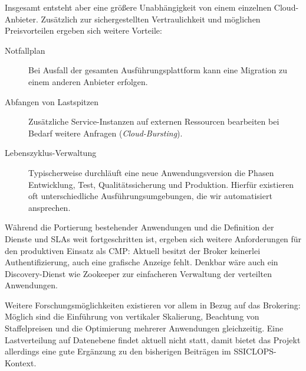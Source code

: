 Insgesamt entsteht aber eine größere Unabhängigkeit von einem einzelnen Cloud-Anbieter. Zusätzlich zur sichergestellten Vertraulichkeit und möglichen Preisvorteilen ergeben sich weitere Vorteile:

\begin{description}
	
	\item[Notfallplan] Bei Ausfall der gesamten Ausführungsplattform kann eine Migration zu einem anderen Anbieter erfolgen.
	
	\item[Abfangen von Lastspitzen] Zusätzliche Service-Instanzen auf externen Ressourcen bearbeiten bei Bedarf weitere Anfragen (\emph{Cloud-Bursting}).
	
	\item[Lebenszyklus-Verwaltung] Typischerweise durchläuft eine neue Anwendungsversion die Phasen Entwicklung, Test, Qualitätssicherung und Produktion. Hierfür existieren oft unterschiedliche Ausführungsumgebungen, die wir automatisiert ansprechen.
	
\end{description}

Während die Portierung bestehender Anwendungen und die Definition der Dienste und SLAs weit fortgeschritten ist, ergeben sich weitere Anforderungen für den produktiven Einsatz als CMP: Aktuell besitzt der Broker keinerlei Authentifizierung, auch eine grafische Anzeige fehlt. Denkbar wäre auch ein Discovery-Dienst wie Zookeeper zur einfacheren Verwaltung der verteilten Anwendungen.

Weitere Forschungsmöglichkeiten existieren vor allem in Bezug auf das Brokering: Möglich sind die Einführung von vertikaler Skalierung, Beachtung von Staffelpreisen und die Optimierung mehrerer Anwendungen gleichzeitig. Eine Lastverteilung auf Datenebene findet aktuell nicht statt, damit bietet das Projekt allerdings eine gute Ergänzung zu den bisherigen Beiträgen im SSICLOPS-Kontext.